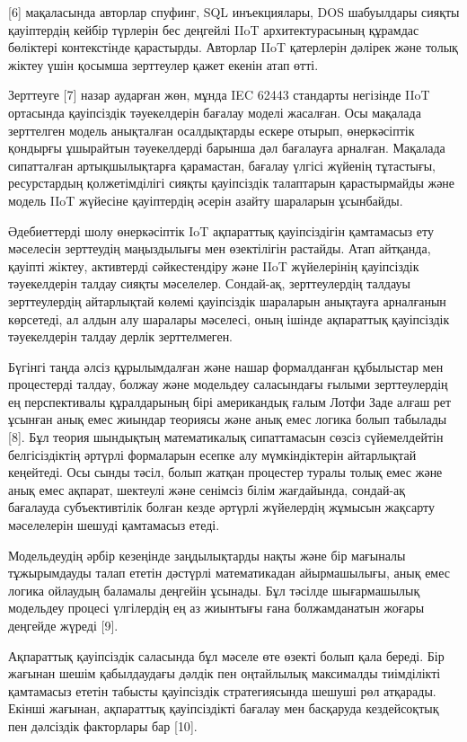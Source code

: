 {[}6{]} мақаласында авторлар спуфинг, SQL инъекциялары, DOS шабуылдары
сияқты қауіптердің кейбір түрлерін бес деңгейлі IIoT архитектурасының
құрамдас бөліктері контекстінде қарастырды. Авторлар IIoT қатерлерін
дәлірек және толық жіктеу үшін қосымша зерттеулер қажет екенін атап
өтті.

Зерттеуге {[}7{]} назар аударған жөн, мұнда IEC 62443 стандарты
негізінде IIoT ортасында қауіпсіздік тәуекелдерін бағалау моделі
жасалған. Осы мақалада зерттелген модель анықталған осалдықтарды ескере
отырып, өнеркәсіптік қондырғы ұшырайтын тәуекелдерді барынша дәл
бағалауға арналған. Мақалада сипатталған артықшылықтарға қарамастан,
бағалау үлгісі жүйенің тұтастығы, ресурстардың қолжетімділігі сияқты
қауіпсіздік талаптарын қарастырмайды және модель IIoT жүйесіне
қауіптердің әсерін азайту шараларын ұсынбайды.

Әдебиеттерді шолу өнеркәсіптік IoT ақпараттық қауіпсіздігін қамтамасыз
ету мәселесін зерттеудің маңыздылығы мен өзектілігін растайды. Атап
айтқанда, қауіпті жіктеу, активтерді сәйкестендіру және IIoT жүйелерінің
қауіпсіздік тәуекелдерін талдау сияқты мәселелер. Сондай-ақ,
зерттеулердің талдауы зерттеулердің айтарлықтай көлемі қауіпсіздік
шараларын анықтауға арналғанын көрсетеді, ал алдын алу шаралары
мәселесі, оның ішінде ақпараттық қауіпсіздік тәуекелдерін талдау дерлік
зерттелмеген.

Бүгінгі таңда әлсіз құрылымдалған және нашар формалданған құбылыстар мен
процестерді талдау, болжау және модельдеу саласындағы ғылыми
зерттеулердің ең перспективалы құралдарының бірі американдық ғалым Лотфи
Заде алғаш рет ұсынған анық емес жиындар теориясы және анық емес логика
болып табылады {[}8{]}. Бұл теория шындықтың математикалық сипаттамасын
сөзсіз сүйемелдейтін белгісіздіктің әртүрлі формаларын есепке алу
мүмкіндіктерін айтарлықтай кеңейтеді. Осы сынды тәсіл, болып жатқан
процестер туралы толық емес және анық емес ақпарат, шектеулі және
сенімсіз білім жағдайында, сондай-ақ бағалауда субъективтілік болған
кезде әртүрлі жүйелердің жұмысын жақсарту мәселелерін шешуді қамтамасыз
етеді.

Модельдеудің әрбір кезеңінде заңдылықтарды нақты және бір мағыналы
тұжырымдауды талап ететін дәстүрлі математикадан айырмашылығы, анық емес
логика ойлаудың баламалы деңгейін ұсынады. Бұл тәсілде шығармашылық
модельдеу процесі үлгілердің ең аз жиынтығы ғана болжамданатын жоғары
деңгейде жүреді {[}9{]}.

Ақпараттық қауіпсіздік саласында бұл мәселе өте өзекті болып қала
береді. Бір жағынан шешім қабылдаудағы дәлдік пен оңтайлылық максималды
тиімділікті қамтамасыз ететін табысты қауіпсіздік стратегиясында шешуші
рөл атқарады. Екінші жағынан, ақпараттық қауіпсіздікті бағалау мен
басқаруда кездейсоқтық пен дәлсіздік факторлары бар {[}10{]}.

